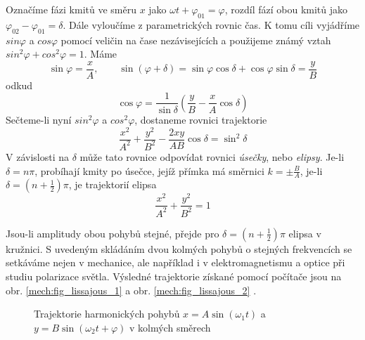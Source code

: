       Označíme fázi kmitů ve směru $x$ jako $\omega t+\varphi_{01} = \varphi$, rozdíl fází obou kmitů jako 
      $\varphi_{02}-\varphi_{01} =\delta$. Dále vyloučíme z parametrických rovnic čas. K tomu cíli vyjádříme 
      $sin\varphi$ a $cos\varphi$ pomocí veličin na čase nezávisejících a použijeme známý vztah $sin^2\varphi 
      + cos^2\varphi = 1$. Máme
      \begin{equation}\label{mech:eq_lissajous2}
          \sin\varphi=\frac{x}{A}, \qquad 
          \sin(\varphi+\delta)=\sin\varphi\cos\delta+\cos\varphi\sin\delta=\frac{y}{B}
      \end{equation}
      odkud
      \begin{equation}\label{mech:eq_lissajous3}
          \cos\varphi=\frac{1}{\sin\delta}\left(\frac{y}{B}-\frac{x}{A}\cos\delta\right)
      \end{equation}
      Sečteme-li nyní $sin^2\varphi$ a $cos^2\varphi$, dostaneme rovnici trajektorie
      \begin{equation}\label{mech:eq_lissajous4}
          \frac{x^2}{A^2}+\frac{y^2}{B^2}-\frac{2xy}{AB}\cos\delta=\sin^2\delta
      \end{equation}
      V závislosti na $\delta$ může tato rovnice odpovídat rovnici \emph{úsečky}, nebo \emph{elipsy}. Je-li 
      $\delta = n\pi$, probíhají kmity po úsečce, jejíž přímka má směrnici $k = \pm\frac{B}{A}$, je-li 
      $\delta = \left(n + \frac{1}{2}\right)\pi$, je trajektorií
      elipsa
      \begin{equation}\label{mech:eq_lissajous5}
          \frac{x^2}{A^2}+\frac{y^2}{B^2}=1
      \end{equation}

      Jsou-li amplitudy obou pohybů stejné, přejde pro $\delta = \left(n+\frac{1}{2}\right)\pi$ elipsa v 
      kružnici. S uvedeným skládáním dvou kolmých pohybů o stejných frekvencích se setkáváme nejen v 
      mechanice, ale například i v elektromagnetismu a optice při studiu polarizace světla. Výsledné 
      trajektorie získané pomocí počítače jsou na obr. \ref{mech:fig_lissajous_1} a obr. 
      \ref{mech:fig_lissajous_2} \cite{Stoll}.

      \begin{figure*}
        \centering
        \caption[Skládání harm. pohybů v kolmých směrech]{Trajektorie harmonických pohybů
                 $x=A\sin(\omega_1 t)$ a $y=B\sin(\omega_2 t+\varphi)$ v kolmých směrech}
        \label{mech:fig_lissajous_obrazce}
      \end{figure*}

